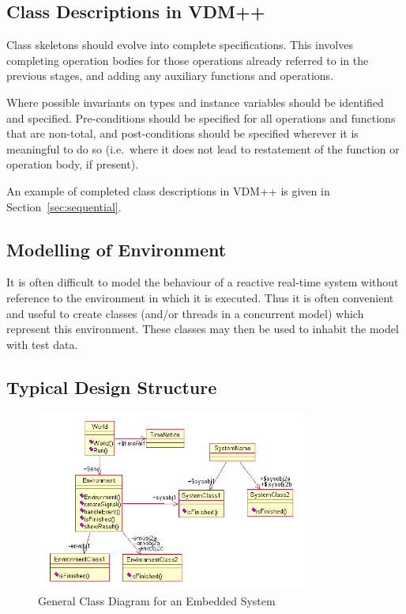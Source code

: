 \documentclass{overturerepchap}
\begin{document}
\subsection{Class Descriptions in VDM++}

Class skeletons should evolve into complete specifications. This
involves completing operation bodies for those operations already
referred to in the previous stages, and adding any auxiliary functions
and operations.

Where possible invariants on types and instance variables should be
identified and specified. Pre-conditions should be specified for all
operations and functions that are non-total, and post-conditions
should be specified wherever it is meaningful to do so (i.e.\ where it
does not lead to restatement of the function or operation body, if
present).

An example of completed class descriptions in VDM++ is given in
Section~\ref{sec:sequential}.

\subsection{Modelling of Environment}

It is often difficult to model the behaviour of a reactive real-time
system without reference to the environment in which it is
executed. Thus it is often convenient and useful to create classes
(and/or threads in a concurrent model) which represent this
environment. These classes may then be used to inhabit the model with
test data.

\subsection{Typical Design Structure}\label{sec:typicalclassdiag}

\begin{figure}
\begin{center}
\includegraphics[width=0.8\textwidth]{figures/generalclassdiag.png}
\end{center}
\caption{General Class Diagram for an Embedded System}\label{fig:classdiag}
\end{figure}
\end{document}
